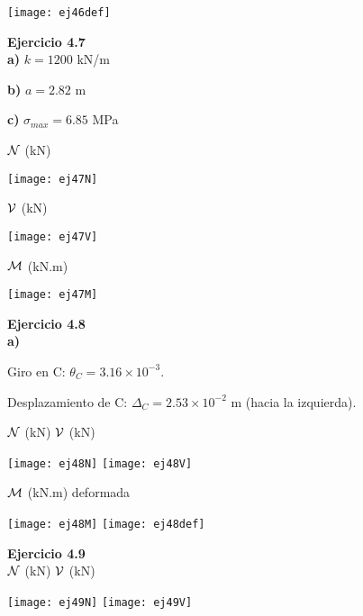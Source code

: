\begin{center}
	\texttt{[image: ej46def]}
\end{center}


\textbf{Ejercicio 4.7}\\

\textbf{a)} $k = 1200$ kN/m

\textbf{b)} $a = 2.82$ m

\textbf{c)} $\sigma_{max} = 6.85$  MPa

${\mathcal N}$ (kN)

\begin{center}
	\texttt{[image: ej47N]}
\end{center}

${\mathcal V}$ (kN)

\begin{center}
	\texttt{[image: ej47V]}
\end{center}

${\mathcal M}$ (kN.m)

\begin{center}
	\texttt{[image: ej47M]}
\end{center}

\textbf{Ejercicio 4.8}\\
\textbf{a)}

Giro en C: $\theta_C = 3.16 \times 10^{-3}$.

Desplazamiento de C: $\Delta_C = 2.53 \times 10^{-2}$ m (hacia la izquierda).

${\mathcal N}$ (kN) \hspace{0.4\textwidth} ${\mathcal V}$ (kN)
\begin{center}
	\texttt{[image: ej48N]}
	\texttt{[image: ej48V]}
\end{center}

${\mathcal M}$ (kN.m) \hspace{0.4\textwidth} deformada
\begin{center}
	\texttt{[image: ej48M]}
	\texttt{[image: ej48def]}
\end{center}

\textbf{Ejercicio 4.9}\\

${\mathcal N}$ (kN) \hspace{0.4\textwidth} ${\mathcal V}$ (kN)
\begin{center}
	\texttt{[image: ej49N]}
	\texttt{[image: ej49V]}
\end{center}

